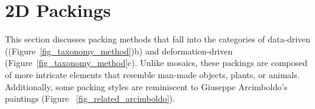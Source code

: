 

\section{2D Packings}

\nnewtext
{
This section discusses packing methods that fall into the categories of data-driven ((Figure~\ref{fig_taxonomy_method})b) and 
deformation-driven (Figure~\ref{fig_taxonomy_method}c).
Unlike mosaics, these packings are composed of 
more intricate elements that resemble man-made objects, plants, or animals.
Additionally, some packing styles are reminiscent to Giuseppe Arcimboldo's paintings 
(Figure ~\ref{fig_related_arcimboldo}).}


